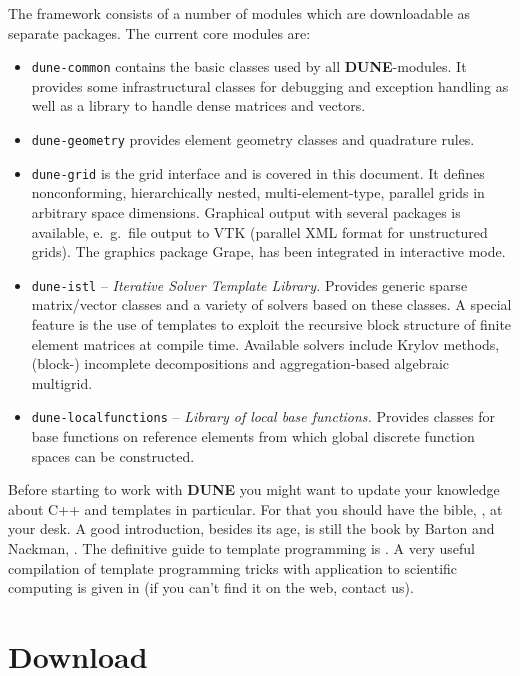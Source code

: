 \documentclass[11pt,a4paper,headinclude,footinclude,DIV16,headings=normal]{scrreprt}
\newcommand{\Dune}{{\sffamily\bfseries DUNE}\xspace}
\begin{document}
The framework consists of a number of modules which are downloadable
as separate packages.  The current core modules are:
\begin{itemize}
\item \texttt{dune-common} contains the basic classes used by all
  \Dune{}-modules.  It provides some infrastructural classes for
  debugging and exception handling as well as a library to handle
  dense matrices and vectors.
\item \texttt{dune-geometry} provides element geometry classes and
  quadrature rules.
\item \texttt{dune-grid} is the grid interface and is covered in
  this document. It defines nonconforming, hierarchically nested,
  multi-element-type, parallel grids in arbitrary space dimensions.
  Graphical output with several packages is available, e.~g.~file
  output to VTK (parallel XML format for
  unstructured grids). The graphics package Grape, \cite{Grape} has
  been integrated in interactive mode.
\item \texttt{dune-istl} -- \textit{Iterative Solver Template
    Library.} Provides generic sparse matrix/vector classes and a
  variety of solvers based on these classes. A special feature is the
  use of templates to exploit the recursive block structure of finite
  element matrices at compile time. Available solvers include Krylov
  methods, (block-) incomplete decompositions and aggregation-based
  algebraic multigrid.
 \item \texttt{dune-localfunctions} -- \textit{Library of local base
  functions.} Provides classes for base functions on reference elements
  from which global discrete function spaces can be constructed.
\end{itemize}

Before starting to work with \Dune{} you might want to update your
knowledge about C++ and templates in particular. For that you should
have the bible, \cite{Stroustrup}, at your desk. A good introduction,
besides its age, is still the book by Barton and Nackman,
\cite{BN}. The definitive guide to template programming is
\cite{VandervoordeJosuttis}. A very useful compilation of template
programming tricks with application to scientific computing is given
in \cite{Veldhui99} (if you can't find it on the web, contact us).

\section{Download}
\end{document}
